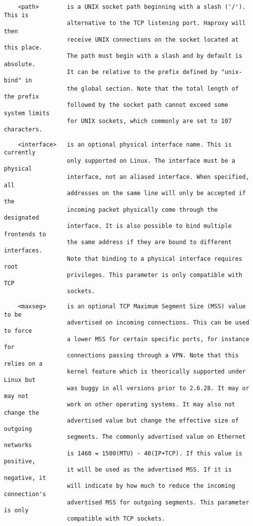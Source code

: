 \begin{verbatim}
    <path>        is a UNIX socket path beginning with a slash ('/'). This is
                  alternative to the TCP listening port. Haproxy will then
                  receive UNIX connections on the socket located at this place.
                  The path must begin with a slash and by default is absolute.
                  It can be relative to the prefix defined by "unix-bind" in
                  the global section. Note that the total length of the prefix
                  followed by the socket path cannot exceed some system limits
                  for UNIX sockets, which commonly are set to 107 characters.
\end{verbatim}

\begin{verbatim}
    <interface>   is an optional physical interface name. This is currently
                  only supported on Linux. The interface must be a physical
                  interface, not an aliased interface. When specified, all
                  addresses on the same line will only be accepted if the
                  incoming packet physically come through the designated
                  interface. It is also possible to bind multiple frontends to
                  the same address if they are bound to different interfaces.
                  Note that binding to a physical interface requires root
                  privileges. This parameter is only compatible with TCP
                  sockets.
\end{verbatim}

\begin{verbatim}
    <maxseg>      is an optional TCP Maximum Segment Size (MSS) value to be
                  advertised on incoming connections. This can be used to force
                  a lower MSS for certain specific ports, for instance for
                  connections passing through a VPN. Note that this relies on a
                  kernel feature which is theorically supported under Linux but
                  was buggy in all versions prior to 2.6.28. It may or may not
                  work on other operating systems. It may also not change the
                  advertised value but change the effective size of outgoing
                  segments. The commonly advertised value on Ethernet networks
                  is 1460 = 1500(MTU) - 40(IP+TCP). If this value is positive,
                  it will be used as the advertised MSS. If it is negative, it
                  will indicate by how much to reduce the incoming connection's
                  advertised MSS for outgoing segments. This parameter is only
                  compatible with TCP sockets.
\end{verbatim}

